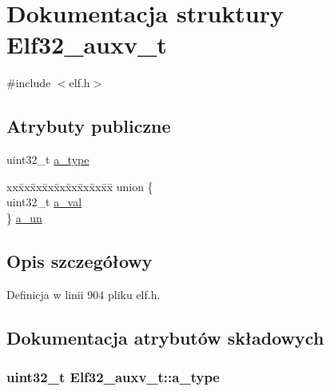 \hypertarget{struct_elf32__auxv__t}{\section{Dokumentacja struktury Elf32\-\_\-auxv\-\_\-t}
\label{struct_elf32__auxv__t}
}


{\ttfamily \#include $<$elf.\-h$>$}

\subsection*{Atrybuty publiczne}
\begin{DoxyCompactItemize}
\item 
uint32\-\_\-t \hyperlink{struct_elf32__auxv__t_ab6d0fd7066a8703da6fa658d3c0c085d}{a\-\_\-type}
\item 
\begin{tabbing}
xx\=xx\=xx\=xx\=xx\=xx\=xx\=xx\=xx\=\kill
union \{\\
\>uint32\_t \hyperlink{struct_elf32__auxv__t_a527cb12aa61f2b93e67e72b2d9bb6312}{a\_val}\\
\} \hyperlink{struct_elf32__auxv__t_afe17fc70719136f46462ccd117875236}{a\_un}\\

\end{tabbing}\end{DoxyCompactItemize}


\subsection{Opis szczegółowy}


Definicja w linii 904 pliku elf.\-h.



\subsection{Dokumentacja atrybutów składowych}
\hypertarget{struct_elf32__auxv__t_ab6d0fd7066a8703da6fa658d3c0c085d}{
\subsubsection[{a\-\_\-type}]{\setlength{\rightskip}{0pt plus 5cm}uint32\-\_\-t Elf32\-\_\-auxv\-\_\-t\-::a\-\_\-type}}\label{struct_elf32__auxv__t_ab6d0fd7066a8703da6fa658d3c0c085d}


